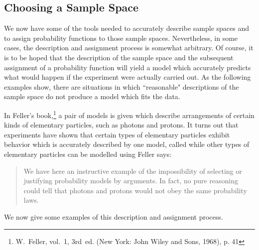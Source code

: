 \subsection*{Choosing a Sample Space}

We now have some of the tools needed to accurately describe sample spaces and to assign
probability functions to those sample spaces.  Nevertheless, in some cases, the
description and assignment process is somewhat arbitrary.  Of course, it is to be
hoped that the description of the sample space and the subsequent assignment of a
probability function will yield a model which accurately predicts what would happen if
the experiment were actually carried out.  As the following examples show, there are
situations in which ``reasonable" descriptions of the sample space do not produce a
model which fits the data.  

In Feller's book,\footnote{W.~Feller,  vol.~1, 3rd~ed. (New York: John Wiley and Sons, 1968), p. 41} a pair
of models is given which describe arrangements of certain kinds of elementary
particles, such as photons and protons. It turns out that experiments
have shown that certain types of elementary particles exhibit behavior which is accurately described
by one model, called   while other
types of elementary particles can be  modelled using   Feller says: 

\begin{quote} We have here an instructive example of the impossibility of selecting or
justifying probability models by  arguments.  In fact, no pure
reasoning could tell that photons and protons would not obey the same probability laws.
\end{quote}

We now give some examples of this description and assignment process.

